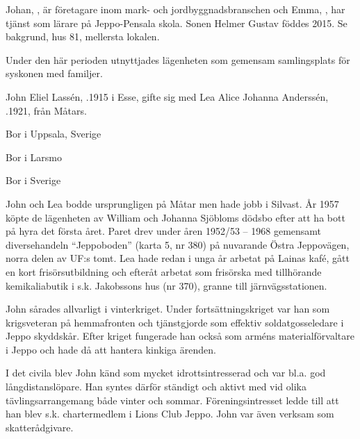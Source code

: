Johan, , är företagare inom mark- och jordbyggnadsbranschen och Emma, , har tjänst som lärare på Jeppo-Pensala skola. Sonen Helmer Gustav föddes 2015. Se bakgrund, hus 81, mellersta lokalen.


Under den här perioden utnyttjades lägenheten som gemensam samlingsplats för syskonen med familjer.\jhvspace{}


John Eliel Lassén, .1915 i Esse, gifte sig med Lea Alice Johanna Anderssén, .1921, från Måtars.
\begin{jhchildren}
  \item {} Bor i Uppsala, Sverige
  \item {} Bor i Larsmo
  \item {}
  \item {} Bor i Sverige
  \item {}
\end{jhchildren}

John och Lea bodde ursprungligen på Måtar men hade jobb i Silvast. År 1957 köpte de lägenheten av William och Johanna Sjöbloms dödsbo efter att ha bott på hyra det första året. Paret drev under åren 1952/53 -- 1968 gemensamt diversehandeln ``Jeppoboden'' (karta 5, nr 380) på nuvarande Östra Jeppovägen, norra delen av UF:s tomt. Lea hade redan i unga år arbetat på Lainas kafé, gått en kort frisörsutbildning och efteråt arbetat som frisörska med tillhörande kemikaliabutik i s.k. Jakobssons hus (nr 370), granne till järnvägsstationen.

John sårades allvarligt i vinterkriget. Under fortsättningskriget var han som krigsveteran på hemmafronten och tjänstgjorde som effektiv soldatgosseledare i Jeppo skyddskår. Efter kriget fungerade han också som arméns materialförvaltare i Jeppo och hade då att hantera kinkiga ärenden.

I det civila blev John känd som mycket idrottsintresserad och var bl.a. god långdistanslöpare. Han syntes därför ständigt och aktivt med vid olika tävlingsarrangemang både vinter och sommar. Föreningsintresset ledde till att han blev s.k. chartermedlem i Lions Club Jeppo. John var även verksam som skatterådgivare.

